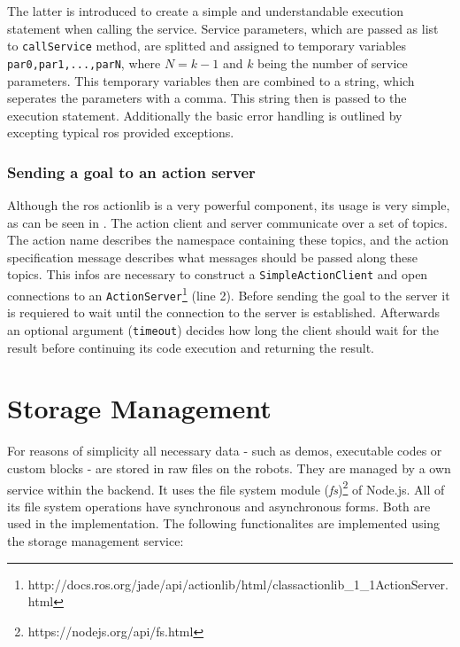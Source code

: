 The latter is introduced to create a simple and understandable execution statement when calling the service. Service parameters, which are passed as list to \lstinline!callService! method, are splitted and assigned to temporary variables \lstinline!par0,par1,...,parN!, where $N=k-1$ and $k$ being the number of service parameters. This temporary variables then are combined to a string, which seperates the parameters with a comma. This string then is passed to the execution statement. Additionally the basic error handling is outlined by excepting typical \gls{ros} provided exceptions.

\begin{figure}[ht]
	
\end{figure}

\subsubsection{Sending a goal to an action server}
Although the \gls{ros} actionlib is a very powerful component, its usage is very simple, as can be seen in . The action client and server communicate over a set of topics. The action name describes the namespace containing these topics, and the action specification message describes what messages should be passed along these topics. This infos are necessary to construct a \lstinline!SimpleActionClient! and open connections to an \lstinline!ActionServer!\footnote{http://docs.ros.org/jade/api/actionlib/html/classactionlib\_1\_1ActionServer.html} (line 2). Before sending the goal to the server it is requiered to wait until the connection to the server is established. Afterwards an optional argument (\lstinline!timeout!) decides how long the client should wait for the result before continuing its code execution and returning the result.


\begin{figure}[htbp]
	
\end{figure}

\section{Storage Management}
For reasons of simplicity all necessary data - such as demos, executable codes or custom blocks - are stored in raw files on the robots. They are managed by a own service within the backend. It uses the file system module (\textit{fs})\footnote{https://nodejs.org/api/fs.html} of Node.js. All of its file system operations have synchronous and asynchronous forms. Both are used in the implementation. The following functionalites are implemented using the storage management service:

